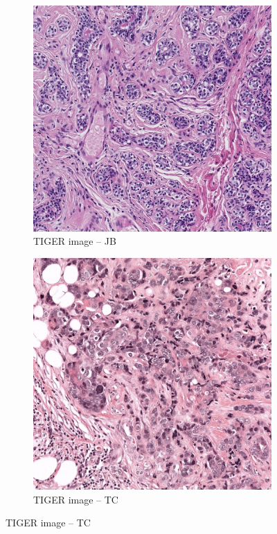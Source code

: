 \begin{figure}[H]
  \centering
  \begin{subfigure}[b]{0.32\textwidth}
    \centering
    \includegraphics[width=\linewidth]{assets/images/for_presentation/image_100B_[10779, 11621, 12102, 12874].png}
    \caption{TIGER image – JB}
  \end{subfigure}\quad
  \begin{subfigure}[b]{0.32\textwidth}
    \centering
    \includegraphics[width=\linewidth]{assets/images/for_presentation/image_TC_S01_P000003_C0001_B104_[50106, 52730, 51199, 53794].png}
    \caption{TIGER image – TC}
  \end{subfigure}


\end{figure}

